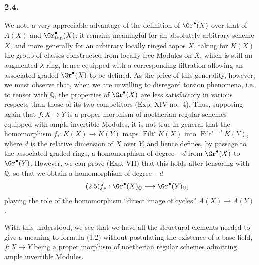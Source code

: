 \subsubsection*{2.4.}
We note a very appreciable advantage of the definition of $\Gr^\bullet(X)$ over that of $A(X)$ and $\Gr^{\bullet}_{\mathrm{top}}(X)$: it remains meaningful for an absolutely arbitrary scheme $X$, and more generally for an arbitrary locally ringed topos $X$, taking for $K(X)$ the group of classes constructed from locally free Modules on $X$, which is still an augmented $\lambda$-ring, hence equipped with a corresponding filtration allowing an associated graded $\Gr^\bullet(X)$ to be defined. As the price of this generality, however, we must observe that, when we are unwilling to disregard torsion phenomena, i.e. to tensor with $\mathbb Q$, the properties of $\Gr^\bullet(X)$ are less satisfactory in various respects than those of its two competitors (Exp. XIV no.~4). Thus, supposing again that $f:X\to Y$ is a proper morphism of noetherian regular schemes equipped with ample invertible Modules, it is not true in general that the homomorphism $f_*:K(X)\longrightarrow K(Y)$ maps $\operatorname{Filt}^i K(X)$ into $\operatorname{Filt}^{i-d} K(Y)$, where $d$ is the relative dimension of $X$ over $Y$, and hence defines, by passage to the associated graded rings, a homomorphism of degree $-d$ from $\Gr^\bullet(X)$ to $\Gr^\bullet(Y)$. However, we can prove (Exp. VII) that this holds after tensoring with $\mathbb Q$, so that we obtain a homomorphism of degree $-d$
\begin{equation}\tag{2.5}
f_*:\Gr^\bullet(X)_{\mathbb Q}\longrightarrow \Gr^\bullet(Y)_{\mathbb Q},
\end{equation}
playing the role of the homomorphism ``direct image of cycles'' $A(X)\to A(Y)$.

With this understood, we see that we have all the structural elements needed to give a meaning to formula (1.2) without postulating the existence of a base field, $f:X\to Y$ being a proper morphism of noetherian regular schemes admitting ample invertible Modules.

